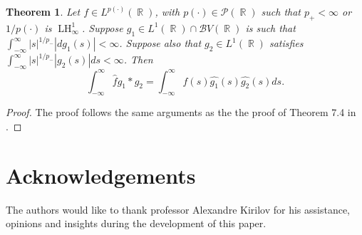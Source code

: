 \documentclass[11pt,reqno]{amsart}
\newtheorem{theorem}{Theorem}[section]
\theoremstyle{definition}
\theoremstyle{definition}
\theoremstyle{definition}
\DeclareMathOperator{\R}{\mathbb{R}}
\newcommand{\p}{p(\cdot)}
\newcommand{\Lp}{L^{\p}(\R)}
\newcommand{\BV}{\mathcal{B}V}
\newcommand{\LH}{\operatorname{LH}_\infty^1}
\begin{document}
\begin{theorem}
    Let $f\in\Lp$, with $\p\in\mathcal{P}(\R)$ such that $p_{+}<\infty$ or $1/\p$ is $\LH$. Suppose $g_1\in L^1(\R)\cap\BV(\R)$ is such that $\int_{-\infty}^\infty|s|^{1/p_{-}}|dg_1(s)|<\infty$. Suppose also that $g_2\in L^1(\R)$ satisfies  $\int_{-\infty}^\infty|s|^{1/p_{-}}|g_2(s)|ds<\infty$. Then 
    \begin{equation}
        \int_{-\infty}^\infty \widehat{f}g_1*g_2=\int_{-\infty}^\infty f(s)\widehat{g_1}(s)\widehat{g_2}(s)ds.
    \end{equation}
    \end{theorem}
    \begin{proof}
        The proof follows the same arguments as the the proof of Theorem 7.4 in \cite{Talvila2025}.
    \end{proof}

\section*{Acknowledgements}

The authors would like to thank professor Alexandre Kirilov for his assistance, opinions and insights during the development of this paper.
\end{document}
